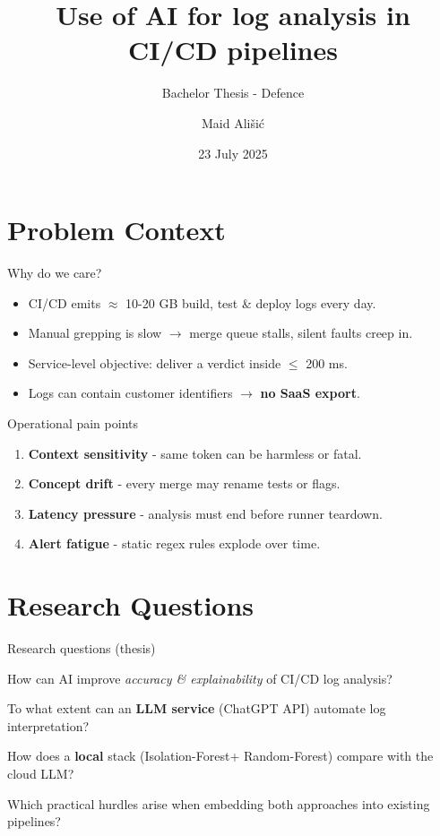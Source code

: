 \documentclass[14pt,aspectratio=169,draft]{beamer}
\title{Use of AI for log analysis in CI/CD pipelines}
\subtitle{Bachelor Thesis - Defence}
\author{Maid Ališi\'c}
\institute{University of Applied Sciences Upper Austria, Campus Hagenberg}
\date{23 July 2025}
\newcommand{\IForest}{Isolation-Forest\xspace}
\newcommand{\RForest}{Random-Forest\xspace}
\begin{document}

\maketitle

\section{Problem Context}
\begin{frame}{Why do we care?}
\begin{itemize}[<+->]
  \item CI/CD emits \alert{$\approx$ 10-20 GB} build, test \& deploy logs every day.
  \item Manual grepping is slow $\xrightarrow{}$ merge queue stalls, silent faults creep in.
  \item Service-level objective: deliver a verdict inside \alert{ $\leq$ 200 ms}.
  \item Logs can contain customer identifiers $\xrightarrow{}$ \textbf{no SaaS export}.
\end{itemize}
\end{frame}

\begin{frame}{Operational pain points}
\begin{enumerate}[<+->]
  \item \textbf{Context sensitivity} - same token can be harmless or fatal.
  \item \textbf{Concept drift} - every merge may rename tests or flags.
  \item \textbf{Latency pressure} - analysis must end before runner teardown.
  \item \textbf{Alert fatigue} - static regex rules explode over time.
\end{enumerate}
\end{frame}

\section{Research Questions}
\begin{frame}{Research questions (thesis)}
\begin{description}[<+->]
  \item[RQ\textsubscript{main}] How can AI improve \emph{accuracy \& explainability} of CI/CD log analysis?
  \item[RQ1] To what extent can an \textbf{LLM service} (ChatGPT API) automate log interpretation?
  \item[RQ2] How does a \textbf{local} stack (\IForest + \RForest) compare with the cloud LLM?
  \item[RQ3] Which practical hurdles arise when embedding both approaches into existing pipelines?
\end{description}
\end{frame}
\end{document}

